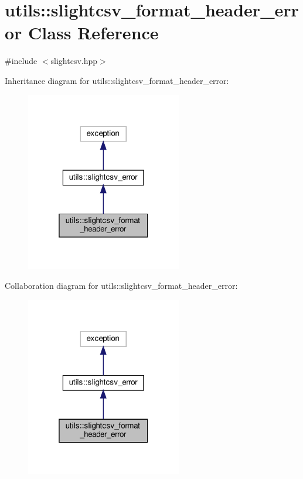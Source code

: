 \hypertarget{classutils_1_1slightcsv__format__header__error}{}\section{utils\+:\+:slightcsv\+\_\+format\+\_\+header\+\_\+error Class Reference}
\label{classutils_1_1slightcsv__format__header__error}


{\ttfamily \#include $<$slightcsv.\+hpp$>$}



Inheritance diagram for utils\+:\+:slightcsv\+\_\+format\+\_\+header\+\_\+error\+:
\nopagebreak
\begin{figure}[H]
\begin{center}
\leavevmode
\includegraphics[width=193pt]{classutils_1_1slightcsv__format__header__error__inherit__graph}
\end{center}
\end{figure}


Collaboration diagram for utils\+:\+:slightcsv\+\_\+format\+\_\+header\+\_\+error\+:
\nopagebreak
\begin{figure}[H]
\begin{center}
\leavevmode
\includegraphics[width=193pt]{classutils_1_1slightcsv__format__header__error__coll__graph}
\end{center}
\end{figure}


